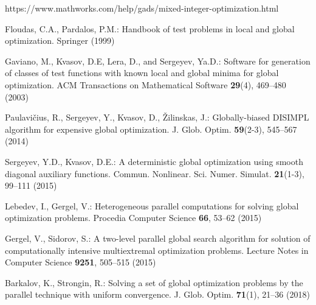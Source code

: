 \documentclass[runningheads]{llncs}
\begin{document}
\begin{thebibliography}{10}
https://www.mathworks.com/help/gads/mixed-integer-optimization.html

Floudas, C.A., Pardalos, P.M.:  Handbook of test problems in local and global optimization.
Springer (1999)  %

 Gaviano, M., Kvasov, D.E, Lera, D., and Sergeyev, Ya.D.: Software for
generation of classes of test functions with known local and global minima for global
optimization. ACM Transactions on Mathematical Software \textbf{29}(4), 469--480 (2003)

Paulavi\v{c}ius, R., Sergeyev, Y., Kvasov, D., \v{Z}ilinskas, J.: Globally-biased DISIMPL
algorithm for expensive global optimization. J. Glob. Optim. \textbf{59}(2-3), 545--567 (2014)

Sergeyev, Y.D., Kvasov, D.E.: A deterministic global optimization using smooth diagonal
auxiliary functions. Commun. Nonlinear. Sci. Numer. Simulat. \textbf{21}(1-3), 99--111 (2015)

Lebedev, I., Gergel, V.: Heterogeneous parallel computations for solving global optimization
problems. Procedia Computer Science \textbf{66}, 53--62 (2015)

Gergel, V., Sidorov, S.: A two-level parallel global search algorithm for solution of
computationally intensive multiextremal optimization problems. Lecture Notes in Computer
Science  \textbf{9251}, 505--515 (2015)

Barkalov, K., Strongin, R.: Solving a set of global optimization problems by the parallel technique with uniform convergence. J. Glob. Optim. \textbf{71}(1), 21--36 (2018)


\end{thebibliography}
\end{document}
